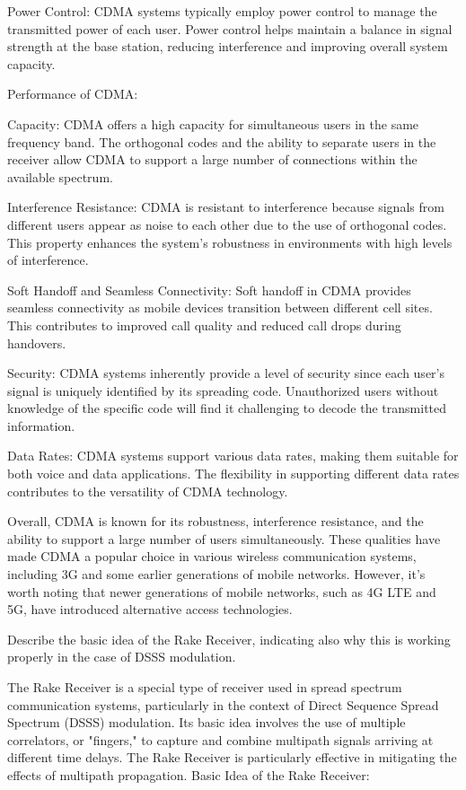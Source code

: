 Power Control:
CDMA systems typically employ power control to manage the transmitted power of each user. Power control helps maintain a balance in signal strength at the base station, reducing interference and improving overall system capacity.

Performance of CDMA:

Capacity:
CDMA offers a high capacity for simultaneous users in the same frequency band. The orthogonal codes and the ability to separate users in the receiver allow CDMA to support a large number of connections within the available spectrum.

Interference Resistance:
CDMA is resistant to interference because signals from different users appear as noise to each other due to the use of orthogonal codes. This property enhances the system's robustness in environments with high levels of interference.

Soft Handoff and Seamless Connectivity:
Soft handoff in CDMA provides seamless connectivity as mobile devices transition between different cell sites. This contributes to improved call quality and reduced call drops during handovers.

Security:
CDMA systems inherently provide a level of security since each user's signal is uniquely identified by its spreading code. Unauthorized users without knowledge of the specific code will find it challenging to decode the transmitted information.

Data Rates:
CDMA systems support various data rates, making them suitable for both voice and data applications. The flexibility in supporting different data rates contributes to the versatility of CDMA technology.

Overall, CDMA is known for its robustness, interference resistance, and the ability to support a large number of users simultaneously. These qualities have made CDMA a popular choice in various wireless communication systems, including 3G and some earlier generations of mobile networks. However, it's worth noting that newer generations of mobile networks, such as 4G LTE and 5G, have introduced alternative access technologies.







Describe the basic idea of the Rake Receiver, indicating also why this is working properly in the case of DSSS modulation.


The Rake Receiver is a special type of receiver used in spread spectrum communication systems, particularly in the context of Direct Sequence Spread Spectrum (DSSS) modulation. Its basic idea involves the use of multiple correlators, or "fingers," to capture and combine multipath signals arriving at different time delays. The Rake Receiver is particularly effective in mitigating the effects of multipath propagation.
Basic Idea of the Rake Receiver:

